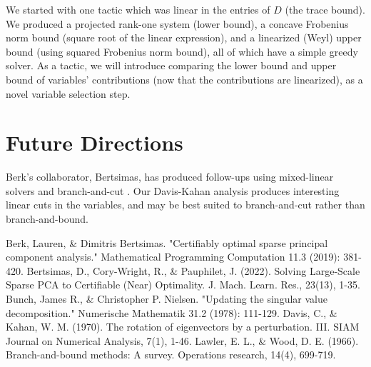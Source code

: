 \documentclass{article}
\begin{document}
We started with one tactic which was linear in the entries of $D$ (the trace bound). We produced a projected rank-one system (lower bound), a concave Frobenius norm bound (square root of the linear expression), and a linearized (Weyl) upper bound (using squared Frobenius norm bound), all of which have a simple greedy solver. As a tactic, we will introduce comparing the lower bound and upper bound of variables' contributions (now that the contributions are linearized), as a novel variable selection step.

\section{Future Directions}

Berk's collaborator, Bertsimas, has produced follow-ups using mixed-linear solvers and branch-and-cut \cite{bertsimas2022solving}. Our Davis-Kahan analysis produces interesting linear cuts in the variables, and may be best suited to branch-and-cut rather than branch-and-bound.

\begin{thebibliography}{9}
     Berk, Lauren, \& Dimitris Bertsimas. "Certifiably optimal sparse principal component analysis." Mathematical Programming Computation 11.3 (2019): 381-420.
     Bertsimas, D., Cory-Wright, R., \& Pauphilet, J. (2022). Solving Large-Scale Sparse PCA to Certifiable (Near) Optimality. J. Mach. Learn. Res., 23(13), 1-35.
     Bunch, James R., \& Christopher P. Nielsen. "Updating the singular value decomposition." Numerische Mathematik 31.2 (1978): 111-129.
     Davis, C., \& Kahan, W. M. (1970). The rotation of eigenvectors by a perturbation. III. SIAM Journal on Numerical Analysis, 7(1), 1-46.
     Lawler, E. L., \& Wood, D. E. (1966). Branch-and-bound methods: A survey. Operations research, 14(4), 699-719.
\end{thebibliography}
\end{document}
